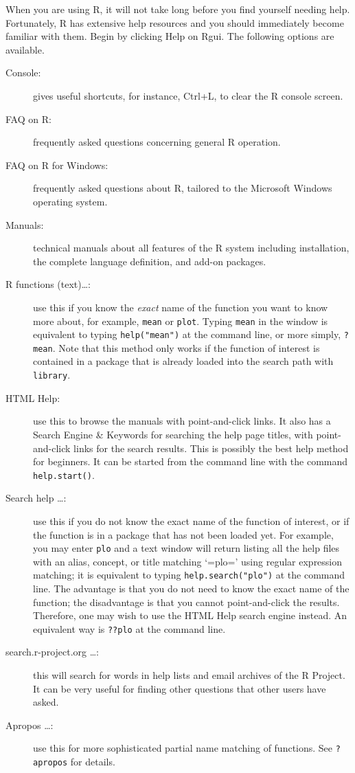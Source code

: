 \documentclass[captions=tableheading]{scrbook}
\begin{document}
When you are using \textsf{R}, it will not take long before you find yourself needing help. Fortunately, \textsf{R} has extensive help resources and you should immediately become familiar with them. Begin by clicking \textsf{Help} on \textsf{Rgui}. The following options are available. 
\begin{description}
\item[Console:] gives useful shortcuts, for instance, \textsf{Ctrl+L}, to clear the \textsf{R} console screen.
\item[FAQ on \textsf{R}:] frequently asked questions concerning general \textsf{R} operation.
\item[FAQ on \textsf{R} for Windows:] frequently asked questions about \textsf{R}, tailored to the Microsoft Windows operating system.
\item[Manuals:] technical manuals about all features of the \textsf{R} system including installation, the complete language definition, and add-on packages.
\item[\textsf{R} functions (text)\ldots{}:] use this if you know the \emph{exact} name of the function you want to know more about, for example, \texttt{mean} or \texttt{plot}. Typing \texttt{mean} in the window is equivalent to typing \texttt{help("mean")} at the command line, or more simply, \texttt{?mean}. Note that this method only works if the function of interest is contained in a package that is already loaded into the search path with \texttt{library}.
\item[HTML Help:] use this to browse the manuals with point-and-click links. It also has a Search Engine \& Keywords for searching the help page titles, with point-and-click links for the search results. This is possibly the best help method for beginners. It can be started from the command line with the command \texttt{help.start()}.
\item[Search help \ldots{}:] use this if you do not know the exact name of the function of interest, or if the function is in a package that has not been loaded yet. For example, you may enter \texttt{plo} and a text window will return listing all the help files with an alias, concept, or title matching `=plo=' using regular expression matching; it is equivalent to typing \texttt{help.search("plo")} at the command line. The advantage is that you do not need to know the exact name of the function; the disadvantage is that you cannot point-and-click the results. Therefore, one may wish to use the HTML Help search engine instead. An equivalent way is \texttt{??plo} at the command line.
\item[search.r-project.org \ldots{}:] this will search for words in help lists and email archives of the \textsf{R} Project. It can be very useful for finding other questions that other users have asked.
\item[Apropos \ldots{}:] use this for more sophisticated partial name matching of functions. See \texttt{?apropos} for details.
\end{description}
\end{document}
